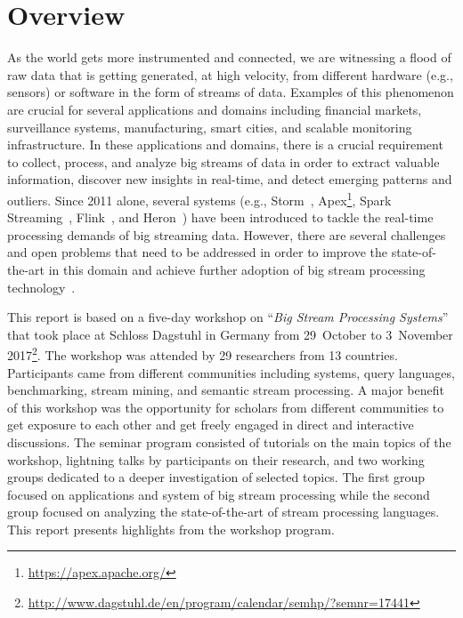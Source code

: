 \section{Overview}\label{sec:overview}

As the world gets more instrumented and connected, we are witnessing a
flood of raw data that is getting generated, at high velocity,
from different hardware (e.g., sensors) or software in the form of
streams of data. Examples of this phenomenon are crucial for several
applications and domains including financial markets, surveillance
systems, manufacturing, smart cities, and scalable monitoring
infrastructure. In these applications and domains, there is a crucial
requirement to collect, process, and analyze big streams of data in
order to extract valuable information, discover new insights in
real-time, and detect emerging patterns and outliers. Since 2011
alone, several systems (e.g.,
\textsf{\small Storm}~\cite{toshniwal_et_al_2014},
\textsf{\small Apex}\footnote{\url{https://apex.apache.org/}},
\textsf{\small Spark Streaming}~\cite{zaharia_et_al_2013},
\textsf{\small Flink}~\cite{carbone_et_al_2015}, and
\textsf{\small Heron}~\cite{kulkarni_et_al_2015}) have
been introduced to tackle the real-time processing demands of big streaming data. However, there are several challenges and open problems that need to be addressed in order to improve the state-of-the-art in this domain and achieve further adoption of big stream processing technology~\cite{sakr2016big}.

This report is based on a five-day workshop on ``\emph{Big Stream
  Processing Systems}'' that took place at Schloss Dagstuhl in Germany
from 29~October to 3~November 2017\footnote{\url{http://www.dagstuhl.de/en/program/calendar/semhp/?semnr=17441}}. The workshop was attended by 29 researchers from  13 countries. Participants came from different communities including systems, query languages, benchmarking, stream mining, and semantic stream processing. A major benefit of this workshop was the opportunity for scholars from different communities to get exposure to each other and get freely engaged in direct and interactive discussions. The seminar program consisted of tutorials on the main topics of the workshop, lightning talks by participants on their research, and two working groups dedicated to a deeper investigation of selected topics. The first group focused on applications and system of big stream processing while the second group focused on analyzing the state-of-the-art of stream processing languages. This report presents highlights from the workshop program.
